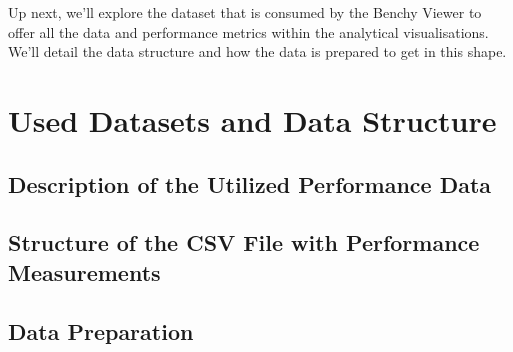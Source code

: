 Up next, we'll explore the dataset that is consumed by the Benchy Viewer to offer all the data and performance metrics within the analytical visualisations. We'll detail the data structure and how the data is prepared to get in this shape.

\section{Used Datasets and Data Structure}
\subsection{Description of the Utilized Performance Data}
\subsection{Structure of the CSV File with Performance Measurements}
\subsection{Data Preparation}


